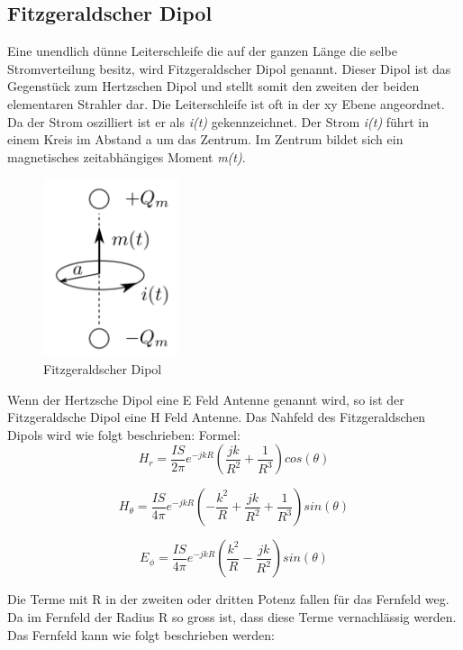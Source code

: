 \subsection{Fitzgeraldscher Dipol }
Eine unendlich dünne Leiterschleife die auf der ganzen Länge die selbe Stromverteilung besitz, wird Fitzgeraldscher Dipol genannt. Dieser Dipol ist das Gegenstück zum Hertzschen Dipol und stellt somit den zweiten der beiden elementaren Strahler dar. Die Leiterschleife ist oft in der xy Ebene angeordnet. Da der Strom oszilliert ist er als \textit{i(t)} gekennzeichnet. Der Strom \textit{i(t)} führt in einem Kreis im Abstand a um das Zentrum. Im Zentrum bildet sich ein magnetisches zeitabhängiges Moment \textit{m(t)}.
\begin{figure}[!htb]
	\centering
	\includegraphics[width=4cm]{content/bilder/Fitzgerald_Dipol_EMANT_S37.pdf}%
	\caption{Fitzgeraldscher Dipol}
	\label{FitzDipol}
\end{figure}
Wenn der Hertzsche Dipol eine E Feld Antenne genannt wird, so ist der Fitzgeraldsche Dipol eine H Feld Antenne. Das Nahfeld des Fitzgeraldschen Dipols wird wie folgt beschrieben:
Formel:
\begin{equation}
H_r= \frac{I S}{2\pi}   e^{-jkR} \left( \frac{jk}{R^{2}}  + \frac{1}{R^{3}} \right) cos(\theta)
\end{equation}

\begin{equation}
H_\theta= \frac{I S}{4\pi}   e^{-jkR} \left(- \frac{k^{2}}{R}  + \frac{jk}{R^{2}}+ \frac{1}{R^{3}} \right) sin(\theta)
\end{equation}

\begin{equation}
E_\phi= \frac{I S}{4\pi}   e^{-jkR} \left( \frac{k^{2}}{R}  - \frac{jk}{R^{2}} \right) sin(\theta)
\end{equation}

Die Terme mit R in der zweiten oder dritten Potenz fallen für das Fernfeld weg. Da im Fernfeld der Radius R so gross ist, dass diese Terme vernachlässig werden. 
Das Fernfeld kann wie folgt beschrieben werden:

